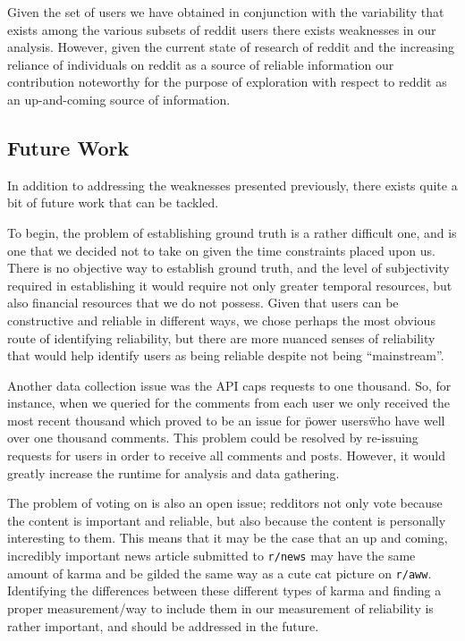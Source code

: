 Given the set of users we have obtained in conjunction with the variability that
exists among the various subsets of reddit users there exists weaknesses in our
analysis. However, given the current state of research of reddit and the
increasing reliance of individuals on reddit as a source of reliable information
our contribution noteworthy for the purpose of exploration with respect to
reddit as an up-and-coming source of information.


\subsection{Future Work} %
\label{sub:future_work}
In addition to addressing the weaknesses presented previously, there exists
quite a bit of future work that can be tackled.

To begin, the problem of establishing ground truth is a rather difficult one,
and is one that we decided not to take on given the time constraints placed upon
us. There is no objective way to establish ground truth, and the level of
subjectivity required in establishing it would require not only greater temporal
resources, but also financial resources that we do not possess. Given that users
can be constructive and reliable in different ways, we chose perhaps the most
obvious route of identifying reliability, but there are more nuanced senses of
reliability that would help identify users as being reliable despite not being
``mainstream''.

Another data collection issue was the API caps requests to one thousand. So,
for instance, when we queried for the comments from each user we only received
the most recent thousand which proved to be an issue for \"power users\" who have
well over one thousand comments. This problem could be resolved by re-issuing
requests for users in order to receive all comments and posts. However, it would
greatly increase the runtime for analysis and data gathering.

The problem of voting on \reddit{} is also an open issue; redditors not only
vote because the content is important and reliable, but also because the content
is personally interesting to them. This means that it may be the case that an up
and coming, incredibly important news article submitted to \texttt{r/news} may
have the same amount of karma and be gilded the same way as a cute cat picture
on \texttt{r/aww}. Identifying the differences between these different types of
karma and finding a proper measurement/way to include them in our measurement of
reliability is rather important, and should be addressed in the future.

